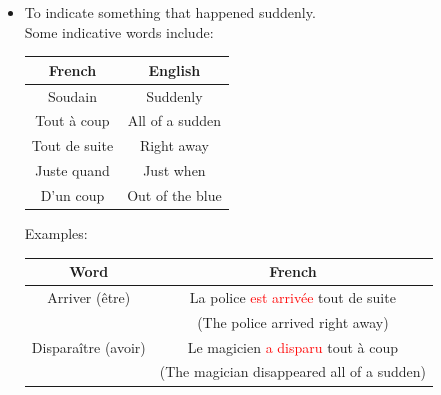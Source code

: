 \documentclass{book}
\begin{document}
\begin{itemize}
    \item To indicate something that happened suddenly.\\
    Some indicative words include:
    \begin{center}
        \begin{tabular}{|c|c|}
            \hline
            \textbf{French} & \textbf{English} \\
            \hline
            Soudain & Suddenly \\
            \hline
            Tout à coup & All of a sudden \\
            \hline
            Tout de suite & Right away \\
            \hline
            Juste quand & Just when \\
            \hline
            D'un coup & Out of the blue \\
            \hline
        \end{tabular}
    \end{center}
    Examples:
    \begin{center}
        \begin{tabular}{|c|c|}
            \hline
            \textbf{Word} & \textbf{French} \\
            \hline
            Arriver (être) & La police \textcolor{red}{est arrivée} tout de suite \\ 
            & (The police arrived right away) \\
            \hline
            Disparaître (avoir) & Le magicien \textcolor{red}{a disparu} tout à coup \\ 
            & (The magician disappeared all of a sudden) \\
            \hline
        \end{tabular}
    \end{center}


\end{itemize}
\end{document}
